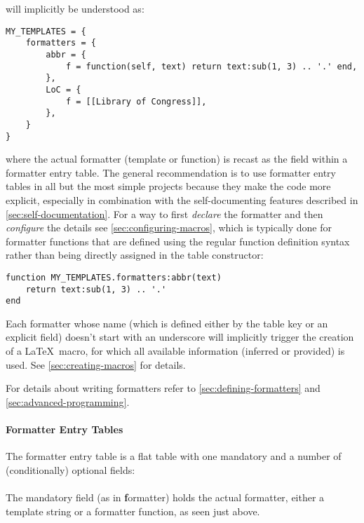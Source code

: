 \documentclass{scrartcl}
\begin{document}
\noindent will implicitly be understood as:

\begin{verbatim}
MY_TEMPLATES = {
    formatters = {
        abbr = {
            f = function(self, text) return text:sub(1, 3) .. '.' end,
        },
        LoC = {
            f = [[Library of Congress]],
        },
    }
}
\end{verbatim}

\noindent where the actual formatter (template or function) is recast as the
 field within a formatter entry table. The general recommendation is
to use formatter entry tables in all but the most simple projects because they
make the code more explicit, especially in combination with the self-documenting
features described in \vref{sec:self-documentation}.  For a way to first
\emph{declare} the formatter and then \emph{configure} the details see
\vref{sec:configuring-macros}, which is typically done for formatter functions that are defined using the regular function definition syntax rather than being directly assigned in the table constructor:

\begin{verbatim}
function MY_TEMPLATES.formatters:abbr(text)
    return text:sub(1, 3) .. '.'
end
\end{verbatim}

Each formatter whose name (which is defined either by the table key or an
explicit  field) doesn't start with an underscore will implicitly
trigger the creation of a \LaTeX\ macro, for which all available information
(inferred or provided) is used.  See \vref{sec:creating-macros} for details.

For details about writing formatters refer to \vref{sec:defining-formatters} and
\vref{sec:advanced-programming}.

\paragraph{Formatter Entry Tables}

The formatter entry table is a flat table with one mandatory and a number of
(conditionally) optional fields:

\paragraph{}

The mandatory field  (as in \textbf{f}ormatter) holds the actual
formatter, either a template string or a formatter function, as seen just above.
\end{document}
